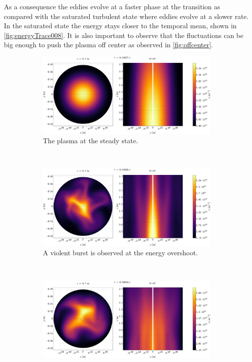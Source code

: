 As a consequence the eddies evolve at a faster phase at the transition as compared with the saturated turbulent state where eddies evolve at a slower rate.
In the saturated state the energy stays closer to the temporal mean, shown in \cref{fig:energyTrace008}.
It is also important to observe that the fluctuations can be big enough to push the plasma off center as observed in \cref{fig:offcenter}.
%
\begin{figure}[htbp]
    \centering
    \begin{subfigure}[h]{1.00\textwidth}
        \centering
        \includegraphics[width=1.0\textwidth]{fig/results/2DTurbulence/steadyStateN}
        \caption{The plasma at the steady state.}
        \label{fig:2Dsteady}
    \end{subfigure}%
    \\
    \begin{subfigure}[h]{1.00\textwidth}
        \centering
        \includegraphics[width=1.0\textwidth]{fig/results/2DTurbulence/violentBurst}
        \caption{A violent burst is observed at the energy overshoot.}
        \label{fig:violentBurst}
    \end{subfigure}
    \\
    \begin{subfigure}[h]{1.00\textwidth}
        \centering
        \includegraphics[width=1.0\textwidth]{fig/results/2DTurbulence/offCenter}

\end{subfigure}
\end{figure}
